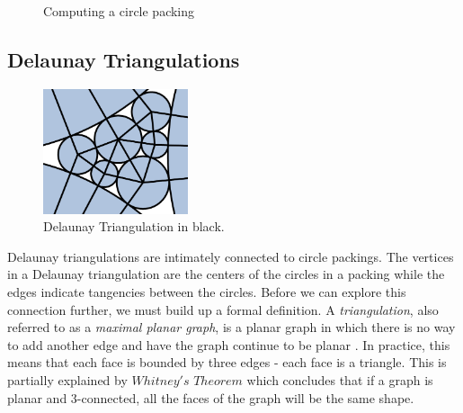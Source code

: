 \documentclass[11pt]{article}
\begin{document}
\begin{figure}%
    \centering
    \qquad
    \caption{Computing a circle packing}%
    \label{fig:inout}%
\end{figure}

\subsection{Delaunay Triangulations}

\begin{figure}
  \begin{center}
    \includegraphics[width=0.38\textwidth]{delaunayemph}
  \end{center}
  \caption{Delaunay Triangulation in black.}
\end{figure}

	Delaunay triangulations are intimately connected to circle packings. The vertices in a Delaunay triangulation are the centers of the circles in a packing while the edges indicate tangencies between the circles. Before we can explore this connection further, we must build up a formal definition.
	A \emph{triangulation}, also referred to as a \emph{maximal planar graph}, is a planar graph in which there is no way to add another edge and have the graph continue to be planar \cite{meshGeneration}. In practice, this means that each face is bounded by three edges - each face is a triangle. This is partially explained by $Whitney's$ $Theorem$ which concludes that if a graph is planar and 3-connected, all the faces of the graph will be the same shape.
\end{document}
